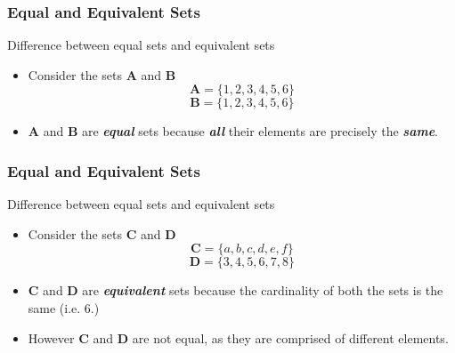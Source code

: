 \documentclass{beamer}
\begin{document}
	\begin{frame}
		\frametitle{Equal and Equivalent Sets}
		\Large
		\vspace{-1cm}
		Difference between equal sets and equivalent sets
		
		\begin{itemize}
			\item Consider the sets \textbf{A} and \textbf{B}
			\[ \boldsymbol{A} = \{ 1,2,3,4,5,6 \} \] 
			\[ \boldsymbol{B} = \{1,2,3,4,5,6 \} \]
			\vspace{0.2cm}
			\item \textbf{A} and \textbf{B} are \textit{\textbf{equal}} sets because \textit{\textbf{all}} their
			elements are precisely the \textit{\textbf{same}}.
		\end{itemize}
		
		
	\end{frame}
	
	\begin{frame}
		\frametitle{Equal and Equivalent Sets}
		\Large
		\vspace{-0.7cm}
		Difference between equal sets and equivalent sets
		
		\begin{itemize}
			\item Consider the sets \textbf{C} and \textbf{D}
			\[ \boldsymbol{C} = \{a,b,c,d,e,f\} \]  \[ \boldsymbol{D} = \{3,4,5,6,7,8\} \]
			\vspace{0.2cm}
			\item \textbf{C} and \textbf{D} are \textit{\textbf{equivalent}} sets
			because the cardinality of both the sets is the same (i.e. 6.)
			\item However \textbf{C} and \textbf{D} are not equal, as they are comprised of different elements.
		\end{itemize}
		
		
		
		
		
	\end{frame}
	
\end{document}
